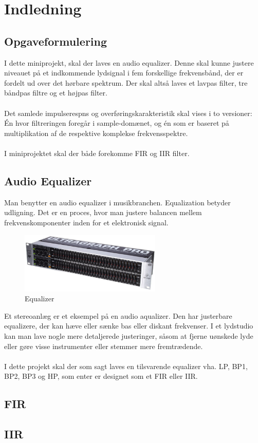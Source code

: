 \chapter{Indledning}

\section{Opgaveformulering}
I dette miniprojekt, skal der laves  en audio equalizer. Denne skal kunne justere niveauet på et indkommende lydsignal i fem forskellige frekvensbånd, der er fordelt ud over det hørbare spektrum. Der skal altså laves et lavpas filter, tre båndpas filtre og et højpas filter. 
\\ \\
Det samlede impulserespns og overføringskarakteristik skal vises i to versioner: Én hvor filtreringen foregår i sample-domænet, og én som er baseret på multiplikation af de respektive komplekse frekvensspektre. 
\\ \\
I miniprojektet skal der både forekomme FIR og IIR filter. 


\section{Audio Equalizer}
Man benytter en audio equalizer i musikbranchen. Equalization betyder udligning. Det er en proces, hvor man justere balancen mellem frekvenskomponenter inden for et elektronisk signal. 

\begin{figure}
	\centering
	\includegraphics[width=0.6\textwidth]{Figur/Snip20151111_60}
	\caption{Equalizer}
\end{figure}

Et stereoanlæg er et eksempel på en audio aqualizer. Den har justerbare equalizere, der kan hæve eller sænke bas eller diskant frekvenser.
I et lydstudio kan man lave nogle mere detaljerede justeringer, såsom at fjerne uønskede lyde eller gøre visse instrumenter eller stemmer mere fremtrædende.
\\ \\
I dette projekt skal der som sagt laves en tilsvarende equalizer vha. LP, BP1, BP2, BP3 og HP, som enter er designet som et FIR eller IIR. 

\section{FIR}

\section{IIR}

 


